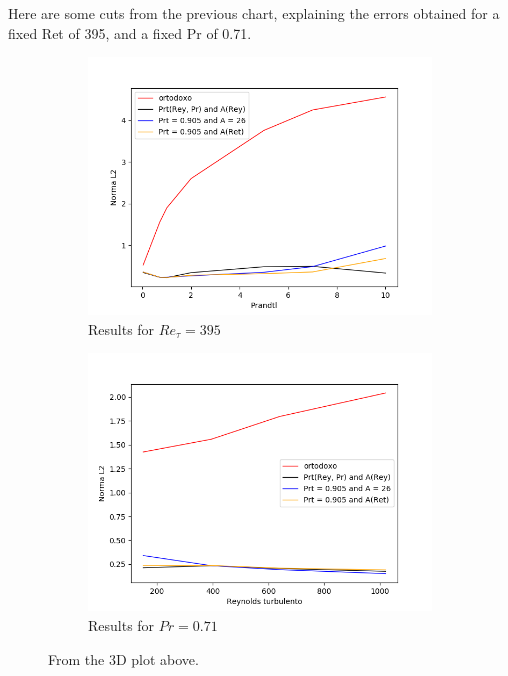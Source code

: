 \documentclass[10pt]{article} %
\begin{document}
Here are some cuts from the previous chart, explaining the errors obtained for a fixed Ret of 395, and a fixed Pr of 0.71.
\begin{figure}[!h]
	\centering
\begin{subfigure}[t]{0.49\textwidth}
	\centering
	\includegraphics[angle=0, scale=0.35]{finaispr}
	\caption{Results for $Re_\tau = 395$}
\end{subfigure}
\begin{subfigure}[t]{0.49\textwidth}
	\centering
	\includegraphics[angle=0, scale=0.35]{finaisRey}
	\caption{Results for $Pr = 0.71$}
\end{subfigure}
\caption{From the 3D plot above.}
\end{figure}
\end{document}
